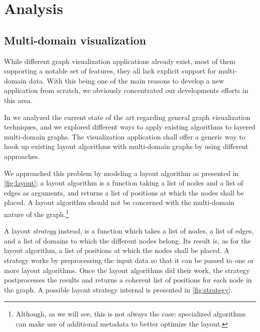 \section{Analysis}
\label{sec:visu/analysis}

\subsection{Multi-domain visualization}

While different graph visualization applications already exist, most of them supporting a notable set of features, they all lack explicit support for multi-domain data. With this being one of the main reasons to develop a new application from scratch, we obviously concentrated our developments efforts in this area.

In \cite{graphvisu} we analyzed the current state of the art regarding general graph visualization techniques, and we explored different ways to apply existing algorithms to layered multi-domain graphs. The visualization application shall offer a generic way to hook up existing layout algorithms with multi-domain graphs by using different approaches.

We approached this problem by modeling a layout algorithm as presented in \vref{fig:layout}; a layout algorithm is a function taking a list of nodes and a list of edges as arguments, and returns a list of positions at which the nodes shall be placed. A layout algorithm should not be concerned with the multi-domain nature of the graph.\footnote{Although, as we will see, this is not always the case: specialized algorithms can make use of additional metadata to better optimize the layout.}

A layout \emph{strategy} instead, is a function which takes a list of nodes, a list of edges, and a list of domains to which the different nodes belong. Its result is, as for the layout algorithm, a list of positions at which the nodes shall be placed. A strategy works by preprocessing the input data so that it can be passed to one or more layout algorithms. Once the layout algorithms did their work, the strategy postprocesses the results and returns a coherent list of positions for each node in the graph. A possible layout strategy internal is presented in \vref{fig:strategy}.

